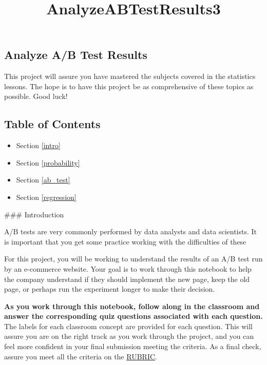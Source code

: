 \documentclass[11pt]{article}
\title{AnalyzeABTestResults3}
\providecommand{\tightlist}{%
      \setlength{\itemsep}{0pt}\setlength{\parskip}{0pt}}
\begin{document}
    
    
    \maketitle
    
    

    
    \hypertarget{analyze-ab-test-results}{%
\subsection{Analyze A/B Test Results}\label{analyze-ab-test-results}}

This project will assure you have mastered the subjects covered in the
statistics lessons. The hope is to have this project be as comprehensive
of these topics as possible. Good luck!

\hypertarget{table-of-contents}{%
\subsection{Table of Contents}\label{table-of-contents}}

\begin{itemize}
\tightlist
\item
  Section \ref{intro}
\item
  Section \ref{probability}
\item
  Section \ref{ab_test}
\item
  Section \ref{regression}
\end{itemize}

 \#\#\# Introduction

A/B tests are very commonly performed by data analysts and data
scientists. It is important that you get some practice working with the
difficulties of these

For this project, you will be working to understand the results of an
A/B test run by an e-commerce website. Your goal is to work through this
notebook to help the company understand if they should implement the new
page, keep the old page, or perhaps run the experiment longer to make
their decision.

\textbf{As you work through this notebook, follow along in the classroom
and answer the corresponding quiz questions associated with each
question.} The labels for each classroom concept are provided for each
question. This will assure you are on the right track as you work
through the project, and you can feel more confident in your final
submission meeting the criteria. As a final check, assure you meet all
the criteria on the
\href{https://review.udacity.com/\#!/projects/37e27304-ad47-4eb0-a1ab-8c12f60e43d0/rubric}{RUBRIC}.
\end{document}

